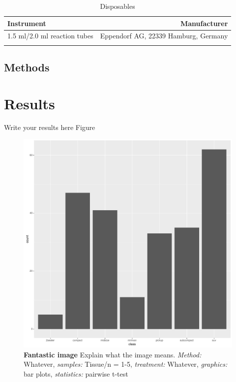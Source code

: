 \documentclass[
	    a4paper, 				%
	    bibliography=totocnumbered,		%
	    listof=totocnumbered,		%
	    11pt, 				%
]{scrreprt}
\begin{document}
				\begin{longtable}{||l|r||}
					Instrument&Manufacturer\\
					\hline\hline
						\multirow{2}{0.62\textwidth}{1.5 ml/2.0 ml reaction tubes}&
						\multirow{2}{0.30\textwidth}{Eppendorf AG, 22339 Hamburg, Germany}\\&\\										
					\hline\hline
					\caption{Disposables}
				\end{longtable}
		
		\section{Methods}		

	\chapter{Results}
		Write your results here
		Figure
		

		\begin{figure}
			\includegraphics[width=\textwidth]{images/barplot.pdf}
			\caption{\textbf{Fantastic image} 
				\newline 
				Explain what the image means.
				\newline
				\textit{Method:} Whatever, 
				\textit{samples:} Tissue/n = 1-5, 
				\textit{treatment:} Whatever, 
				\textit{graphics:} bar plots,
				\textit{statistics:} pairwise t-test
			}
			\label{barplot}
		\end{figure}
\end{document}
